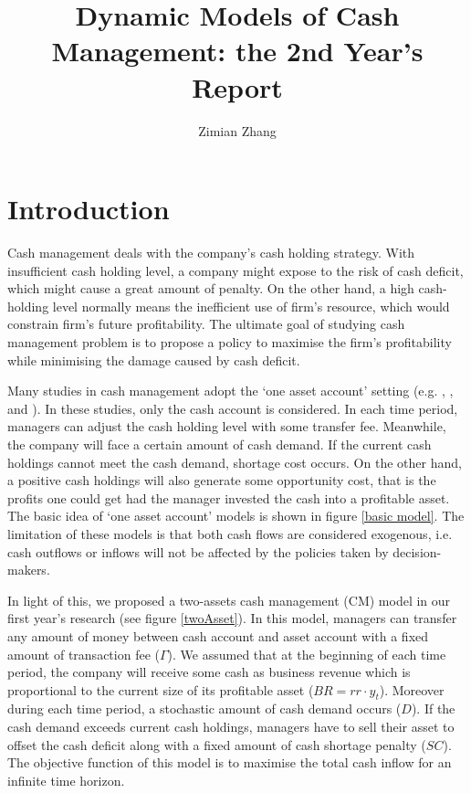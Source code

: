 \documentclass[12pt]{article}
\author{Zimian Zhang}
\title{Dynamic Models of Cash Management: the 2nd Year's Report}
\begin{document}
\maketitle
\setcounter{page}{0}
\thispagestyle{empty}


\newpage
\tableofcontents
\setcounter{page}{0}
\thispagestyle{empty}

\newpage

\section {Introduction}

Cash management deals with the company's cash holding strategy. With insufficient cash holding level, a company might expose to the risk of cash deficit, which might cause a great amount of penalty. On the other hand, a high cash-holding level normally means the inefficient use of firm's resource, which would constrain firm's future profitability. The ultimate goal of studying cash management problem is to propose a policy to maximise the firm's profitability while minimising the damage caused by cash deficit.

Many studies in cash management adopt the `one asset account'  setting (e.g. \cite{baccarin2002optimal}, \cite{sato2011stochastic}, \cite{bensoussan2005optimality} and \cite{feng2010computational}). In these studies, only the cash account is considered. In each time period, managers can adjust the cash holding level with some transfer fee. Meanwhile, the company will face a certain amount of cash demand. If the current cash holdings cannot meet the cash demand, shortage cost occurs. On the other hand, a positive cash holdings will also generate some opportunity cost, that is the profits one could get had the manager invested the cash into a profitable asset. The basic idea of `one asset account' models is shown in figure \ref{basic model}. The limitation of these models is that both cash flows are considered exogenous, i.e. cash outflows or inflows will not be affected by the policies taken by decision-makers. 


In light of this, we proposed a two-assets cash management (CM) model in our first year's research (see figure \ref{twoAsset}). In this model, managers can transfer any amount of money between cash account and asset account with a fixed amount of transaction fee ($\Gamma$). We assumed that at the beginning of each time period, the company will receive some cash as business revenue which is proportional to the current size of its profitable asset ($BR = rr \cdot y_t$). Moreover during each time period, a stochastic amount of cash demand occurs ($D$). If the cash demand exceeds current cash holdings, managers have to sell their asset to offset the cash deficit along with a fixed amount of cash shortage penalty ($SC$). The objective function of this model is to maximise the total cash inflow for an infinite time horizon. 
\end{document}
